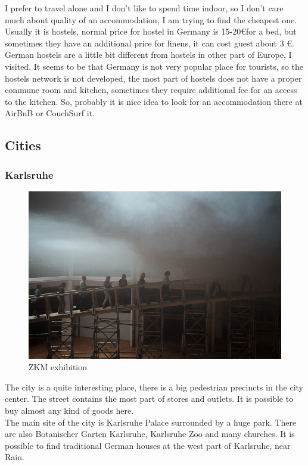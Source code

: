 \documentclass[english]{article}
\begin{document}
I prefer to travel alone and I don't like to spend time indoor, so I don’t care much about quality of an accommodation, I am trying to find the cheapest one. Usually it is hostels, normal price for hostel in Germany is 15-20\euro for a bed, but sometimes they have an additional price for linens, it can cost guest about 3 \euro. German hostels are a little bit different from hostels in other part of Europe, I visited. It seems to be that Germany is not very popular place for tourists, so the hostels network is not developed, the most part of hostels does not have a proper commune room and kitchen, sometimes they require additional fee for an access to the kitchen. So, probably it is nice idea to look for an accommodation there at AirBnB or CouchSurf it.

\subsection{Cities}
\subsubsection{Karlsruhe}

\begin{figure}
\centerline{\includegraphics[scale=0.5]{Germany_travel/zkm}}
\caption{ZKM exhibition}
\end{figure}


The city is a quite interesting place, there is a big pedestrian precincts in the city center. The street contains the most part of stores and outlets. It is possible to buy almost any kind of goods here.\\

The main site of the city is Karlsruhe Palace surrounded by a huge park. There are also Botanischer Garten Karlsruhe, Karlsruhe Zoo and many churches. It is possible to find traditional German houses at the west part of Karlsruhe, near Rain.\\
\end{document}
